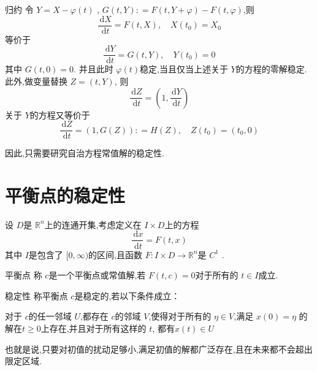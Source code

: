 \documentclass[lang=cn,12pt,color=green,fontset=none]{elegantbook}
\begin{document}
\begin{proposition}{归约}
    令 $ Y = X-\varphi \left( t \right)  $ , $ G\left( t,Y \right): = F\left( t,Y+ \varphi  \right)-F\left( t,\varphi  \right)    $,则 $$
    \frac{\,\mathrm{d} X }{\,\mathrm{d} t } =F\left( t,X \right),\quad  X\left( t_0 \right)=X_0  
    $$ 等价于 $$
    \frac{\,\mathrm{d} Y }{\,\mathrm{d} t } = G\left( t,Y \right),\quad  Y\left( t_0 \right)=0   
    $$其中 $ G\left( t,0 \right)=0  $.  并且此时 $ \varphi \left( t \right)  $稳定,当且仅当上述关于 $ Y $的方程的零解稳定.
    此外,做变量替换 $ Z=\left( t,Y \right)  $, 则 $$
    \frac{\,\mathrm{d} Z }{\,\mathrm{d} t } = \left( 1, \frac{\,\mathrm{d} Y }{\,\mathrm{d} t }  \right)   
    $$ 关于 $ Y $的方程又等价于 $$
    \frac{\,\mathrm{d} Z }{\,\mathrm{d} t } = \left( 1,G\left( Z \right)  \right): = H\left( Z \right),\quad Z\left( t_0 \right)= \left( t_0,0 \right)    
    $$ 
\end{proposition}

\begin{remark}
    因此,只需要研究自治方程常值解的稳定性.
\end{remark}





\section{平衡点的稳定性}

设 $ D $是 $ \mathbb{R} ^{n} $上的连通开集,考虑定义在 $ I\times D $上的方程 $$
\frac{\,\mathrm{d} x }{\,\mathrm{d} t } = F\left( t,x \right)  
$$   其中 $ I $是包含了 $ [0,\infty ) $的区间,且函数 $ F: I\times D\to \mathbb{R} ^{n} $是 $ C^{1} $  .

\begin{definition}{平衡点}
    称 $ c $是一个平衡点或常值解,若 $ F\left( t,c \right)=0  $对于所有的 $ t \in I $成立.   
\end{definition}

\begin{definition}{稳定性}
    称平衡点 $ c $是稳定的,若以下条件成立：
    
    对于 $ c $的任一邻域 $ U $,都存在 $ c $的邻域 $ V $,使得对于所有的 $ \eta  \in V $,满足 $ x\left( 0 \right)=\eta   $  的解在$ t \ge 0 $上存在,并且对于所有这样的 $ t $, 都有$ x\left( t  \right)\in U  $   
\end{definition}
\begin{note}
    也就是说,只要对初值的扰动足够小,满足初值的解都广泛存在,且在未来都不会超出限定区域.
\end{note}
\end{document}
